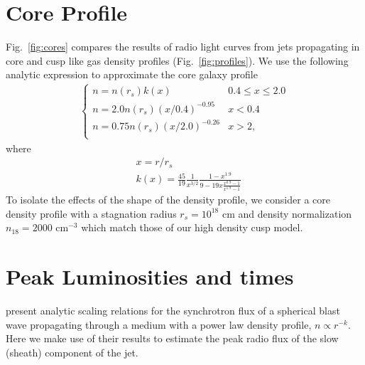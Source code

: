\documentclass[usenatbib,fleqn]{mnras}
\begin{document}
\section{Core Profile}
\label{app:core}
Fig.~\ref{fig:cores} compares the results of radio light curves from jets propagating in core and cusp like gas density
profiles (Fig.~\ref{fig:profiles}).  We use the following analytic expression to approximate the core
galaxy profile
\begin{align}
\begin{cases}
n=n(r_s) k(x) & 0.4 \leq x\leq 2.0\\
n = 2.0 n(r_s) (x/0.4)^{-0.95} & x < 0.4\\
n = 0.75 n(r_s) (x/2.0)^{-0.26} & x>2,\\
\end{cases}
\label{eq:cores}
\end{align}
where
\begin{align}
  &x=r/r_s\\\nonumber
  &k(x)=\frac{45}{19} \frac{1}{x^{3/2}} \frac{1-x^{1.9}}{9-19
      x\frac{x^{0.9}-1}{x^{1.9}-1}}
\end{align}
To isolate the effects of the shape of the density profile, we consider a
core density profile with a stagnation radius $r_s=10^{18}$ cm and density normalization $n_{18}=2000$
cm$^{-3}$ which match those of our high density cusp model.

\section{Peak Luminosities and times}
\label{app:analyt}
\citet{Leventis+2012} present analytic scaling relations for the
synchrotron flux of a spherical blast wave propagating through a
medium with a power law density profile, $n\propto r^{-k}$.  Here we
make use of their results to estimate the peak radio flux of the slow
(sheath) component of the jet.
\end{document}
